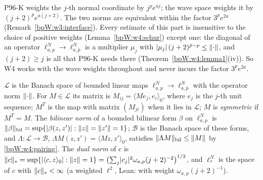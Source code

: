 \begin{remark}\label{bpW:w4:weights}
P96-K weights the $j$-th normal coordinate by $j^pe^{aj}$; the wave space weights it by $(j+2)^pe^{a(j+2)}$. The
two norms are equivalent within the factor $3^pe^{2a}$ (Remark~\ref{bpW:w3:interface}). Every estimate of this part
is insensitive to the choice of positive weights (Lemma~\ref{bpW:w4:schur}) except one: the diagonal of an operator
$\ell^N_{a,p}\to\ell^N_{a,\bar p}$ is a multiplier $\mu_j$ with $\lvert \mu_j\rvert\,(j+2)^{\bar p-p}\le\lVert \cdot\rVert$, and
$(j+2)\ge j$ is all that P96-K needs there (Theorem~\ref{bpW:w4:lemma1}(iv)). So W4 works with the wave weights
throughout and never incurs the factor $3^pe^{2a}$.
\end{remark}

\begin{definition}\label{bpW:w4:ops}
$\mathcal L$ is the Banach space of bounded linear maps $\ell^N_{a,p}\to\ell^N_{a,\bar p}$ with the operator norm
$\lVert \cdot\rVert$. For $M\in\mathcal L$ its matrix is $M_{ij}=\langle Me_j,e_i\rangle_0$, where $e_j$ is the $j$-th unit
sequence; $M^T$ is the map with matrix $(M_{ji})$ when it lies in $\mathcal L$; $M$ is \emph{symmetric} if $M^T=M$.
The \emph{bilinear norm} of a bounded bilinear form $\beta$ on $\ell^N_{a,p}$ is
$\lVert \beta\rVert_{\rm bil}=\sup\{\lvert \beta(z,z')\rvert:\lVert z\rVert=\lVert z'\rVert=1\}$; $\mathcal B$ is the Banach space of these forms,
and $\Lambda:\mathcal L\to\mathcal B$, $\Lambda M(z,z')=\langle Mz,z'\rangle_0$, satisfies
$\lVert \Lambda M\rVert_{\rm bil}\le\lVert M\rVert$ by \eqref{bpW:w4:pairing}. The \emph{dual norm} of $c$ is
$\lVert c\rVert_*=\sup\{\lvert \langle c,z\rangle_0\rvert:\lVert z\rVert=1\}=\bigl(\sum_j\lvert c_j\rvert^2\omega_{a,p}(j+2)^{-2}\bigr)^{1/2}$, and
$\ell^N_*$ is the space of $c$ with $\lVert c\rVert_*<\infty$ (a weighted $\ell^2$, Lean:  with weight
$\omega_{a,p}(j+2)^{-1}$).
\end{definition}

